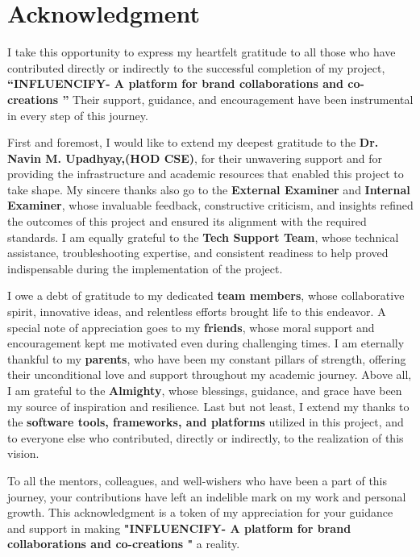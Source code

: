\chapter*{Acknowledgment}
\begin{justify}
I take this opportunity to express my heartfelt gratitude to all those who have contributed directly or indirectly to the successful completion of my project, \textbf{“INFLUENCIFY- A platform for brand collaborations and co-creations
”} Their support, guidance, and encouragement have been instrumental in every step of this journey.  

First and foremost, I would like to extend my deepest gratitude to the \textbf{Dr. Navin M. Upadhyay,(HOD CSE)}, for their unwavering support and for providing the infrastructure and academic resources that enabled this project to take shape. My sincere thanks also go to the \textbf{External Examiner} and \textbf{Internal Examiner}, whose invaluable feedback, constructive criticism, and insights refined the outcomes of this project and ensured its alignment with the required standards. I am equally grateful to the \textbf{Tech Support Team}, whose technical assistance, troubleshooting expertise, and consistent readiness to help proved indispensable during the implementation of the project.  

I owe a debt of gratitude to my dedicated \textbf{team members}, whose collaborative spirit, innovative ideas, and relentless efforts brought life to this endeavor. A special note of appreciation goes to my \textbf{friends}, whose moral support and encouragement kept me motivated even during challenging times. I am eternally thankful to my \textbf{parents}, who have been my constant pillars of strength, offering their unconditional love and support throughout my academic journey. Above all, I am grateful to the \textbf{Almighty}, whose blessings, guidance, and grace have been my source of inspiration and resilience. Last but not least, I extend my thanks to the \textbf{software tools, frameworks, and platforms} utilized in this project, and to everyone else who contributed, directly or indirectly, to the realization of this vision.  

To all the mentors, colleagues, and well-wishers who have been a part of this journey, your contributions have left an indelible mark on my work and personal growth. This acknowledgment is a token of my appreciation for your guidance and support in making \textbf{"INFLUENCIFY- A platform for brand collaborations and co-creations
"} a reality.  
\end{justify}
